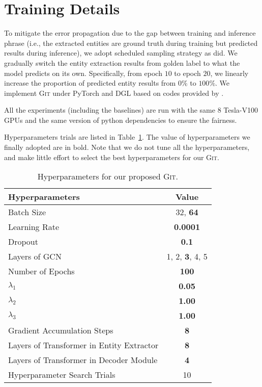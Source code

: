 \documentclass[11pt,a4paper]{article}
\newcommand{\modelname}{\textsc{Git}\xspace}
\begin{document}



\appendix
\appendix

\section{Training Details}
\label{appendix-training}
To mitigate the error propagation due to the gap between training and inference phrase (i.e., the extracted entities are ground truth during training but predicted results during inference), we adopt scheduled sampling strategy \citep{10.5555/2969239.2969370} as \citet{zheng-etal-2019-doc2edag} did.
We gradually switch the entity extraction results from golden label to what the model predicts on its own. 
Specifically, from epoch $10$ to epoch $20$, we linearly increase the proportion of predicted entity results from $0\%$ to $100\%$.
We implement \modelname under PyTorch \citep{paszke2017automatic} and DGL \citep{wang2019dgl} based on codes provided by \citet{zheng-etal-2019-doc2edag}.

All the experiments (including the baselines) are run with the same $8$ Tesla-V100 GPUs and the same version of python dependencies to ensure the fairness.

Hyperparameters trials are listed in Table~\ref{tab:hyperparam}. 
The value of hyperparameters we finally adopted are in bold. 
Note that we do not tune all the hyperparameters, and make little effort to select the best hyperparameters for our \modelname.

\begin{table}[htbp]
\small
\centering
\begin{tabular}{lc}
\hline
\bf Hyperparameters & \bf Value \\
\hline
Batch Size &  32, \textbf{64} \\
Learning Rate  & \textbf{0.0001}  \\
Dropout &  \textbf{0.1}\\
Layers of GCN & 1, 2, \textbf{3}, 4, 5 \\
Number of Epochs & \textbf{100} \\
$\lambda_1$ & \textbf{0.05} \\
$\lambda_2$ & \textbf{1.00} \\
$\lambda_3$ & \textbf{1.00} \\
Gradient Accumulation Steps & \textbf{8} \\
Layers of Transformer in Entity Extractor & \textbf{8} \\
Layers of Transformer in Decoder Module & \textbf{4} \\
\hline \hline
Hyperparameter Search Trials & 10 \\
\hline
\end{tabular}
\caption{Hyperparameters for our proposed \modelname.
}
\label{tab:hyperparam}
\end{table}
\end{document}
